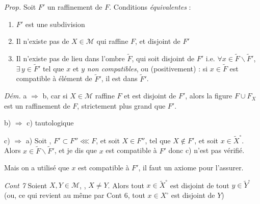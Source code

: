 \documentclass[11pt,a4paper]{article}
\begin{document}
\emph{Prop.} Soit $F'$ un raffinement de $F$. Conditions \emph{équivalentes} :
\begin{enumerate}
  \item[a)] $F'$ est une subdivision
  \item[b)] Il n'existe pas de $X \in \mathcal{M}$ qui raffine $F$, et disjoint de $F'$
  \item[c)]   Il n'existe pas de lieu dans l'ombre $\widetilde{F}$, qui soit disjoint de $F'$  i.e. $\forall x \in \widetilde{F} \smallsetminus \widetilde{F}'$, $\exists\, y \in \widetilde{F}'$ tel que $x$ et $y$ \emph{non compatibles}, ou (positivement) : si $x \in \widetilde{F}$ est compatible à \struck{\ill{}}  élément de $\widetilde{F}'$, il est dans $\widetilde{F}'$.
\end{enumerate}

\emph{Dém.} a $\Rightarrow$ b, car si $X \in \mathcal{M}$ raffine $F$ et est disjoint de $F'$, alors la figure $F \cup F_X$ est un raffinement de $F$, strictement plus grand que $F'$.

b) $\Rightarrow$ c) tautologique

c) $\Rightarrow$ a) Soit \ill{}, $F' \subset F'' \lll F$, et soit $X \in F''$, tel que $X \notin F'$, et soit $x \in \widetilde{X}^{\circ}$. Alors $x \in \widetilde{F} \smallsetminus \widetilde{F}'$, et \struck{\ill{}} je dis que $x$ est compatible à $F'$ donc c) n'est pas vérifié.

Mais on a utilisé que $x$ est compatible à $F'$, il faut un axiome pour l'assurer.

\emph{Cont 7} \quad Soient $X, Y \in \mathcal{M}$, , $X \neq Y$. Alors tout $x \in \widetilde{X}^{\circ}$ est disjoint de tout $y \in \widetilde{Y}^{\circ}$ (ou, ce qui revient au même par Cont 6, \struck{\ill{}} tout $x \in X^{\circ}$ est disjoint de $Y$)
\end{document}
